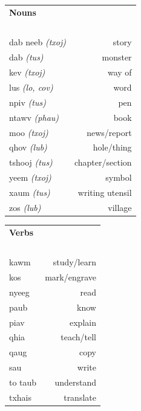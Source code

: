 \documentclass{article}
\begin{document}
\begin{multicols}{2}
[
\section*{}
]

\begin{tabular}{l r}
\textbf{Nouns} \\
~\\
dab neeb {\em (txoj)} &story\\
dab {\em (tus)} &monster\\
kev {\em (txoj)} &way of\\
lus {\em (lo, cov)} &word\\
npiv {\em (tus)} &pen\\
ntawv {\em (phau)} &book\\
moo {\em (txoj)} &news/report\\
qhov {\em (lub)} &hole/thing\\
tshooj {\em (tus)} &chapter/section\\
yeem {\em (txoj)} &symbol\\
xaum {\em (tus)} &writing utensil\\
zos {\em (lub)} &village\\
\end{tabular}

\begin{tabular}{l r}
\textbf{Verbs} \\
~\\
kawm &study/learn\\
kos &mark/engrave\\
nyeeg &read\\
paub &know\\
piav &explain\\
qhia &teach/tell\\
qaug &copy\\
sau &write\\
to taub &understand\\
txhais &translate\\
\end{tabular}
\end{multicols}

\clearpage
\end{document}
